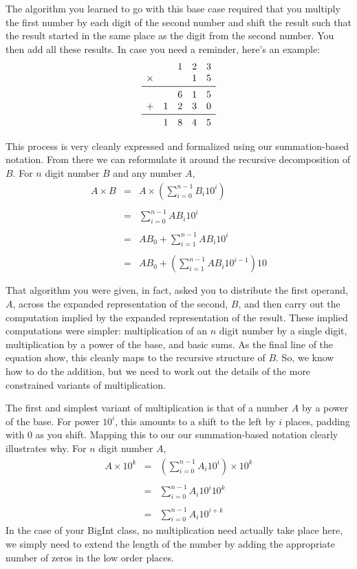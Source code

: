 \documentclass[10pt]{article}
\begin{document}
The algorithm you learned to go with this base case required that you multiply the first number by each digit of the second number and shift the result such that the result started in the same place as the digit from the second number. You then add all these results. In case you need a reminder, here's an example:
\[
\begin{array}{lllll}
 & &1&2&3 \\
\times & & &1&5 \\ \midrule
 & &6 &1 &5 \\
+ &1 &2 &3 &0 \\ \midrule
 &1 &8 &4 &5
\end{array}
\]

This process is very cleanly expressed and formalized using our summation-based notation. From there we can reformulate it around the recursive decomposition of $B$. For $n$ digit number $B$ and any number $A$,
\[
\begin{array}{rcl}
A \times B &=& A \times \left(\sum\limits_{i=0}^{n-1}B_i10^i \right)\\ \\
 &=& \sum\limits_{i=0}^{n-1}AB_i10^i \\ \\
 &=& AB_0 + \sum\limits_{i=1}^{n-1}AB_i10^i \\ \\
 &=& AB_0 + \left(\sum\limits_{i=1}^{n-1}AB_i10^{i-1}\right)10 \\ \\
\end{array}
\]
That algorithm you were given, in fact, asked you to distribute the first operand, $A$, across the expanded representation of the second, $B$, and then carry out the computation implied by the expanded representation of the result. These implied computations were simpler: multiplication of an $n$ digit number by a single digit, multiplication by a power of the base, and basic sums. As the final line of the equation show, this cleanly maps to the recursive structure of $B$. So, we know how to do the addition, but we need to work out the details of the more constrained variants of multiplication.

The first and simplest variant of multiplication is that of a number $A$ by a power of the base. For power $10^i$, this amounts to a shift to the left by $i$ places, padding with $0$ as you shift. Mapping this to our our summation-based notation clearly illustrates why. For $n$ digit number $A$,
\[
\begin{array}{rcl}
A \times 10^k &=& \left( \sum\limits_{i=0}^{n-1}A_i10^i \right) \times 10^k \\ \\
 &=& \sum\limits_{i=0}^{n-1}A_i10^i10^k \\ \\
 &=& \sum\limits_{i=0}^{n-1}A_i10^{i+k}
\end{array}
\]
In the case of your BigInt class, no multiplication need actually take place here, we simply need to extend the length of the number by adding the appropriate number of zeros in the low order places.
\end{document}
